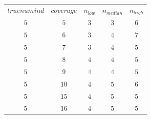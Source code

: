 \begin{table}[H]
\begin{tabular}{ccccc}
$truenumind$ & $coverage$ & $n_{low}$ & $n_{median}$ & $n_{high}$\\
$5$ & $5$ & $3$ & $3$ & $6$\\
$5$ & $6$ & $3$ & $4$ & $7$\\
$5$ & $7$ & $3$ & $4$ & $5$\\
$5$ & $8$ & $4$ & $4$ & $5$\\
$5$ & $9$ & $4$ & $4$ & $5$\\
$5$ & $10$ & $4$ & $5$ & $6$\\
$5$ & $15$ & $4$ & $5$ & $5$\\
$5$ & $16$ & $4$ & $5$ & $5$\\
\end{tabular}
\end{table}
 
